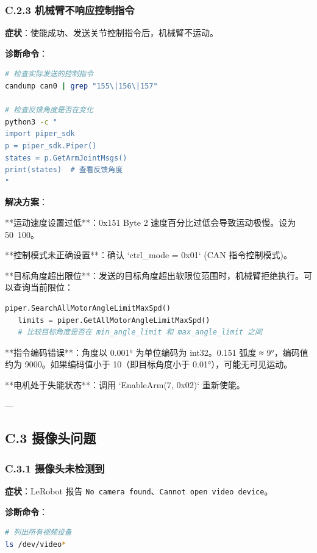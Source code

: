 \documentclass[UTF8,a4paper,11pt]{ctexart}
\begin{document}
{\subsubsection{C.2.3 机械臂不响应控制指令}

\textbf{症状}：使能成功、发送关节控制指令后，机械臂不运动。

\textbf{诊断命令}：
\begin{lstlisting}[language=bash]
# 检查实际发送的控制指令
candump can0 | grep "155\|156\|157"

# 检查反馈角度是否在变化
python3 -c "
import piper_sdk
p = piper_sdk.Piper()
states = p.GetArmJointMsgs()
print(states)  # 查看反馈角度
"
\end{lstlisting}

\textbf{解决方案}：
\item[1] **运动速度设置过低**：0x151 Byte 2 速度百分比过低会导致运动极慢。设为 50~100。
\item[2] **控制模式未正确设置**：确认 `ctrl_mode = 0x01` (CAN 指令控制模式)。
\item[3] **目标角度超出限位**：发送的目标角度超出软限位范围时，机械臂拒绝执行。可以查询当前限位：
\begin{lstlisting}[language=python]
   piper.SearchAllMotorAngleLimitMaxSpd()
   limits = piper.GetAllMotorAngleLimitMaxSpd()
   # 比较目标角度是否在 min_angle_limit 和 max_angle_limit 之间
\end{lstlisting}
\item[4] **指令编码错误**：角度以 0.001° 为单位编码为 int32。0.151 弧度 ≈ 9°，编码值约为 9000。如果编码值小于 10（即目标角度小于 0.01°），可能无可见运动。
\item[5] **电机处于失能状态**：调用 `EnableArm(7, 0x02)` 重新使能。

---

\subsection{C.3 摄像头问题}

\subsubsection{C.3.1 摄像头未检测到}

\textbf{症状}：LeRobot 报告 \texttt{No camera found}、\texttt{Cannot open video device}。

\textbf{诊断命令}：
\begin{lstlisting}[language=bash]
# 列出所有视频设备
ls /dev/video*


\end{lstlisting}}
\end{document}
